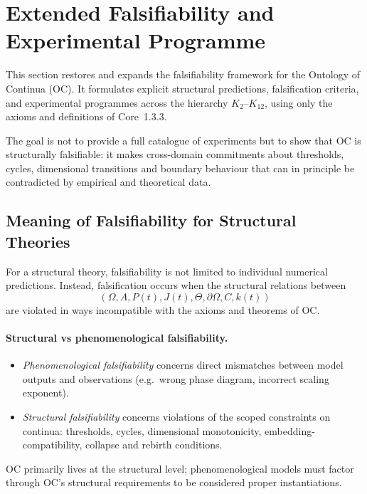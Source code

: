
\section{Extended Falsifiability and Experimental Programme}
\label{sec:falsifiability-extended}

This section restores and expands the falsifiability framework for the
Ontology of Continua (OC). It formulates explicit structural predictions,
falsification criteria, and experimental programmes across the hierarchy
\(K_2\)–\(K_{12}\), using only the axioms and definitions of Core~1.3.3.

The goal is not to provide a full catalogue of experiments but to show that
OC is structurally falsifiable: it makes cross-domain commitments about
thresholds, cycles, dimensional transitions and boundary behaviour that can
in principle be contradicted by empirical and theoretical data.

\subsection{Meaning of Falsifiability for Structural Theories}

For a structural theory, falsifiability is not limited to individual
numerical predictions.  Instead, falsification occurs when the structural
relations between
\[
  (\Omega, A, P(t), J(t),
   \Theta, \partial\Omega, C, k(t))
\]
are violated in ways incompatible with the axioms and theorems of OC.

\paragraph{Structural vs phenomenological falsifiability.}
\begin{itemize}
  \item \emph{Phenomenological falsifiability} concerns direct mismatches
        between model outputs and observations (e.g.\ wrong phase diagram,
        incorrect scaling exponent).
  \item \emph{Structural falsifiability} concerns violations of the scoped
        constraints on continua: thresholds, cycles, dimensional monotonicity,
        embedding-compatibility, collapse and rebirth conditions.
\end{itemize}
OC primarily lives at the structural level; phenomenological models must
factor through OC’s structural requirements to be considered proper
instantiations.

